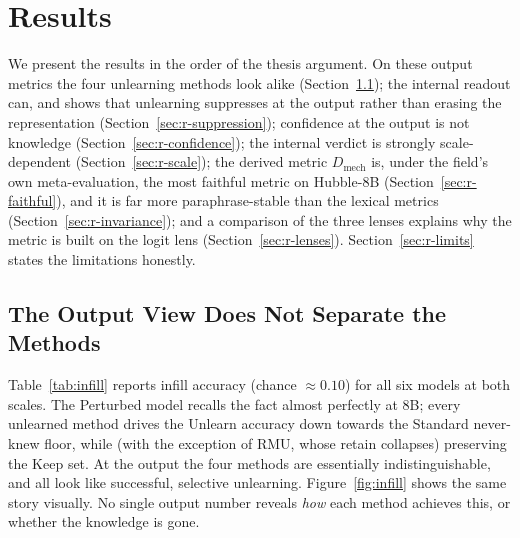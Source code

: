 \chapter{Results}
\label{ch:results}

We present the results in the order of the thesis argument. On these output metrics the four unlearning
methods look alike (Section~\ref{sec:r-output}); the internal readout can, and shows that
unlearning suppresses at the output rather than erasing the representation
(Section~\ref{sec:r-suppression}); confidence at the output is not knowledge (Section~\ref{sec:r-confidence});
the internal verdict is strongly scale-dependent (Section~\ref{sec:r-scale}); the derived metric
$D_\text{mech}$ is, under the field's own meta-evaluation, the most faithful metric on Hubble-8B
(Section~\ref{sec:r-faithful}), and it is far more paraphrase-stable than the lexical metrics
(Section~\ref{sec:r-invariance}); and a comparison of the three lenses explains why the metric is built on
the logit lens (Section~\ref{sec:r-lenses}). Section~\ref{sec:r-limits} states the limitations honestly.

\section{The Output View Does Not Separate the Methods}
\label{sec:r-output}

Table~\ref{tab:infill} reports infill accuracy (chance $\approx 0.10$) for all six models at both scales.
The Perturbed model recalls the fact almost perfectly at 8B; every unlearned method drives the Unlearn
accuracy down towards the Standard never-knew floor, while (with the exception of RMU, whose retain
collapses) preserving the Keep set. At the output the four methods are essentially indistinguishable, and
all look like successful, selective unlearning. Figure~\ref{fig:infill} shows the same story visually.
No single output number reveals \emph{how} each method achieves this, or whether the knowledge is gone.

